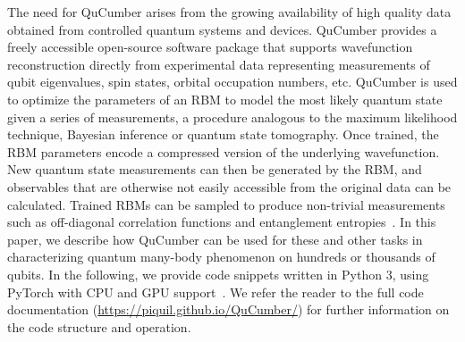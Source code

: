 \documentclass[submission, Phys]{SciPost}
\begin{document}
The need for QuCumber arises from the growing availability of high quality data obtained from controlled quantum
systems and devices.
QuCumber provides a freely accessible open-source software package that supports wavefunction reconstruction directly from experimental data representing measurements of qubit eigenvalues, spin states, orbital occupation numbers, etc.
QuCumber is used to optimize the parameters of an RBM to model the most likely quantum state given a series of measurements,
a procedure analogous to the maximum likelihood technique, Bayesian inference or quantum state tomography. 
Once trained, the RBM parameters encode a compressed version of the underlying wavefunction.
New quantum state measurements can then be generated by the RBM, and observables that are otherwise not easily accessible from the original data can be calculated. 
Trained RBMs can be sampled to produce non-trivial measurements such as off-diagonal correlation functions and entanglement entropies~\cite{Torlai2016thermo, torlai2018tomography}.
In this paper, we describe how QuCumber can be used for these and other tasks in characterizing quantum many-body phenomenon on hundreds or thousands of qubits.
In the following, we provide code snippets written in Python 3, using PyTorch with CPU and GPU support~\cite{paszke2017automatic}.
We refer the reader to the full code documentation (\url{https://piquil.github.io/QuCumber/}) for further information on the code structure and operation.



\end{document}

